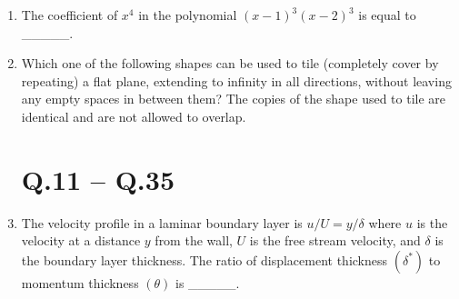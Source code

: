 \documentclass[journal,12pt,onecolumn]{IEEEtran}
\theoremstyle{remark}
\begin{document}
\begin{enumerate}
\item The coefficient of $x^4$ in the polynomial $(x - 1)^3 (x - 2)^3$ is equal to \_\_\_\_\_.\hfill{}

\begin{enumerate}[label=\Alph*.]
\end{enumerate}

\item Which one of the following shapes can be used to tile (completely cover by repeating) a flat plane, extending to infinity in all directions, without leaving any empty spaces in between them?  
The copies of the shape used to tile are identical and are not allowed to overlap.\hfill{}

\begin{enumerate}[label=\Alph*.]
\end{enumerate}

\section*{Q.11 -- Q.35}

\item The velocity profile in a laminar boundary layer is $u/U = y/\delta$ where $u$ is the velocity at a distance $y$ from the wall, $U$ is the free stream velocity, and $\delta$ is the boundary layer thickness.  
The ratio of displacement thickness $(\delta^*)$ to momentum thickness $(\theta)$ is \_\_\_\_\_.\hfill{}

\begin{enumerate}[label=\Alph*.]
\end{enumerate}


\end{enumerate}
\end{document}
